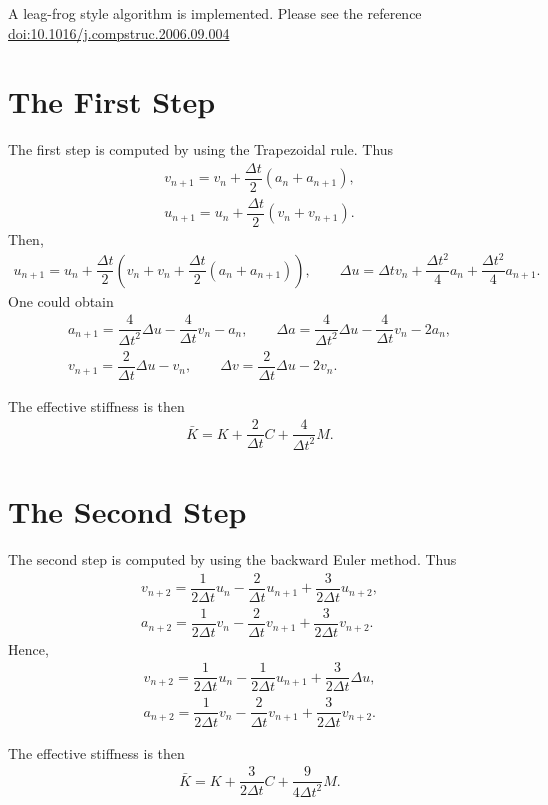 \documentclass[a4paper,10pt,fleqn]{article}
\begin{document}
A leag-frog style algorithm is implemented. Please see the reference \href{https://doi.org/10.1016/j.compstruc.2006.09.004}{doi:10.1016/j.compstruc.2006.09.004}
\section*{The First Step}
The first step is computed by using the Trapezoidal rule. Thus
\begin{gather}
v_{n+1}=v_n+\dfrac{\Delta{}t}{2}\left(a_n+a_{n+1}\right),\\
u_{n+1}=u_n+\dfrac{\Delta{}t}{2}\left(v_n+v_{n+1}\right).
\end{gather}
Then,
\begin{gather}
u_{n+1}=u_n+\dfrac{\Delta{}t}{2}\left(v_n+v_n+\dfrac{\Delta{}t}{2}\left(a_n+a_{n+1}\right)\right),\qquad
\Delta{}u=\Delta{}tv_n+\dfrac{\Delta{}t^2}{4}a_n+\dfrac{\Delta{}t^2}{4}a_{n+1}.
\end{gather}
One could obtain
\begin{gather}
a_{n+1}=\dfrac{4}{\Delta{}t^2}\Delta{}u-\dfrac{4}{\Delta{}t}v_n-a_n,\qquad
\Delta{}a=\dfrac{4}{\Delta{}t^2}\Delta{}u-\dfrac{4}{\Delta{}t}v_n-2a_n,\\
v_{n+1}=\dfrac{2}{\Delta{}t}\Delta{}u-v_n,\qquad
\Delta{}v=\dfrac{2}{\Delta{}t}\Delta{}u-2v_n.
\end{gather}

The effective stiffness is then
\begin{gather}
\bar{K}=K+\dfrac{2}{\Delta{}t}C+\dfrac{4}{\Delta{}t^2}M.
\end{gather}
\section*{The Second Step}
The second step is computed by using the backward Euler method. Thus
\begin{gather}
v_{n+2}=\dfrac{1}{2\Delta{}t}u_n-\dfrac{2}{\Delta{}t}u_{n+1}+\dfrac{3}{2\Delta{}t}u_{n+2},\\
a_{n+2}=\dfrac{1}{2\Delta{}t}v_n-\dfrac{2}{\Delta{}t}v_{n+1}+\dfrac{3}{2\Delta{}t}v_{n+2}.
\end{gather}
Hence,
\begin{gather}
v_{n+2}=\dfrac{1}{2\Delta{}t}u_n-\dfrac{1}{2\Delta{}t}u_{n+1}+\dfrac{3}{2\Delta{}t}\Delta{}u,\\
a_{n+2}=\dfrac{1}{2\Delta{}t}v_n-\dfrac{2}{\Delta{}t}v_{n+1}+\dfrac{3}{2\Delta{}t}v_{n+2}.
\end{gather}

The effective stiffness is then
\begin{gather}
\bar{K}=K+\dfrac{3}{2\Delta{}t}C+\dfrac{9}{4\Delta{}t^2}M.
\end{gather}
\end{document}
